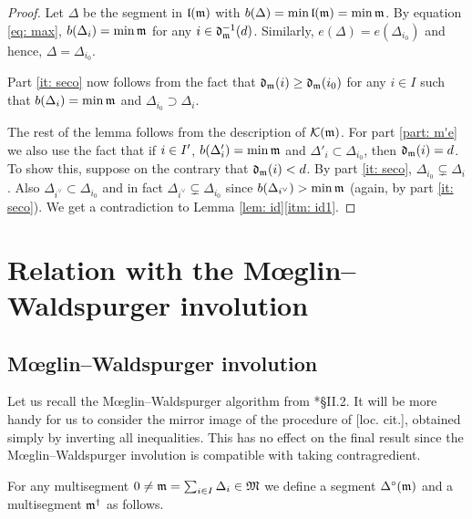 \documentclass{ert-l} %
\begin{document}
\begin{proof}
Let $\Delta$ be the segment in $\mathfrak{l}(\mathfrak{m})$ with $b(\Delta)=\min\mathfrak{l}(\mathfrak{m})=\min\mathfrak{m}$.
By equation \eqref{eq: max}, $b(\Delta_i)=\min\mathfrak{m}$ for any $i\in\mathfrak{d}_{\mathfrak{m}}^{-1}(d)$.
Similarly, $e(\Delta)=e(\Delta_{i_0})$ and hence, $\Delta=\Delta_{i_0}$.

Part \ref{it: seco} now follows from the fact that $\mathfrak{d}_{\mathfrak{m}}(i)\geq \mathfrak{d}_{\mathfrak{m}}(i_0)$ for
any $i\in I$ such that $b(\Delta_i) = \min \mathfrak{m}$ and $\Delta_{i_0}\supset\Delta_i$.

The rest of the lemma follows from the description of $\mathcal{K}(\mathfrak{m})$.
For part \ref{part: m'e} we also use the fact that if $i\in I'$, $b(\Delta'_i)=\min\mathfrak{m}$
and $\Delta'_i\subset\Delta_{i_0}$, then $\mathfrak{d}_{\mathfrak{m}}(i)=d$.
To show this, suppose on the contrary that $\mathfrak{d}_{\mathfrak{m}}(i)<d$.
By part \ref{it: seco}, $\Delta_{i_0}\subsetneq\Delta_i$.
Also $\Delta_{i^\vee}\subset\Delta_{i_0}$ and in fact $\Delta_{i^\vee}\subsetneq\Delta_{i_0}$ since
$b(\Delta_{i^\vee})>\min\mathfrak{m}$ (again, by part \ref{it: seco}).
We get a contradiction to Lemma \ref{lem: id}\eqref{itm: id1}.
\end{proof}



\section{Relation with the M\oe glin--Waldspurger involution}\label{sec: comm}


\subsection{M\oe glin--Waldspurger involution} \label{sec: MW}
Let us recall the M\oe glin--Waldspurger algorithm from \cite{MR863522}*{\S II.2}.
It will be more handy for us to consider the mirror image of the procedure of [loc. cit.], obtained simply by inverting all inequalities.
This has no effect on the final result since the M\oe glin--Waldspurger involution is compatible with taking contragredient.

For any multisegment $0\neq \mathfrak{m} = \sum_{i\in I} \Delta_i \in \mathfrak{M}$ we define a segment $\Delta^{\circ}(\mathfrak{m})$
and a multisegment $\mathfrak{m}^{\dagger}$ as follows.
\end{document}
